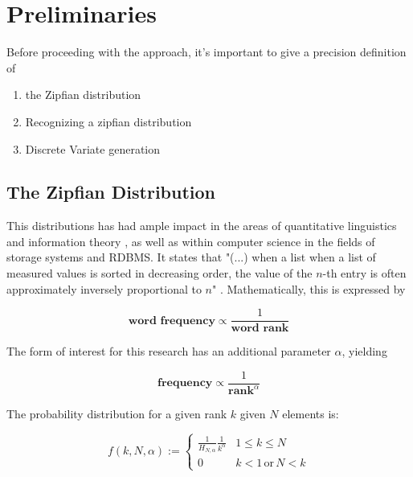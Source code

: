 \chapter{Preliminaries}\label{chapter:preliminaries}

Before proceeding with the approach, it's important to give a precision definition of
\begin{enumerate}
    \item the Zipfian distribution
    \item Recognizing a zipfian distribution
    \item Discrete Variate generation
\end{enumerate}

\section{The Zipfian Distribution}
This distributions has had ample impact in the areas of quantitative linguistics and information theory \cite{powersApplicationsExplanationsZipfs1998a}, as well as within computer science in the fields of storage systems and \ac{RDBMS}\cite{grayQuicklyGeneratingBillionrecord1994}. It states that "(...) when a list when 
a list of measured values is sorted in decreasing order, the value of the $n$-th entry is often approximately inversely proportional to $n$" \cite{ZipfsLaw2025}. Mathematically, this is expressed by

\begin{equation}\label{eqt:zipfs_law}
    \textbf{word frequency} \propto \frac{1}{\textbf{word rank}}
\end{equation}

The form of interest for this research has an additional parameter $\alpha$, yielding

\begin{equation}\label{eqt:zm_law}
    \textbf{frequency} \propto \frac{1}{\textbf{rank}^\alpha}
\end{equation}

The probability distribution for a given rank $k$ given $N$ elements is:

\begin{equation}\label{eqt:zm_prob}
    f(k,N, \alpha) := 
 \begin{cases} 
      \frac{1}{H_{N,\alpha}} \frac{1}{k^\alpha} & 1 \leq k \leq N \\
      0 & k < 1 \, \text{or} \, N < k 
   \end{cases}
\end{equation}

